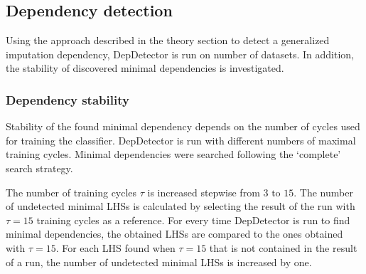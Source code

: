 \subsection{Dependency detection}
Using the approach described in the theory section to detect a generalized imputation dependency, DepDetector is run on number of datasets.
In addition, the stability of discovered minimal dependencies is investigated.

\subsubsection{Dependency stability}
Stability of the found minimal dependency depends on the number of cycles used for training the classifier.
DepDetector is run with different numbers of maximal training cycles.
Minimal dependencies were searched following the `complete' search strategy.

The number of training cycles \( \tau \) is increased stepwise from \( 3 \text{ to } 15 \).
The number of undetected minimal LHSs is calculated by selecting the result of the run with \( \tau = 15 \) training cycles as a reference.
For every time DepDetector is run to find minimal dependencies, the obtained LHSs are compared to the ones obtained with \( \tau = 15 \).
For each LHS found when \( \tau = 15 \) that is not contained in the result of a run, the number of undetected minimal LHSs is increased by one.


